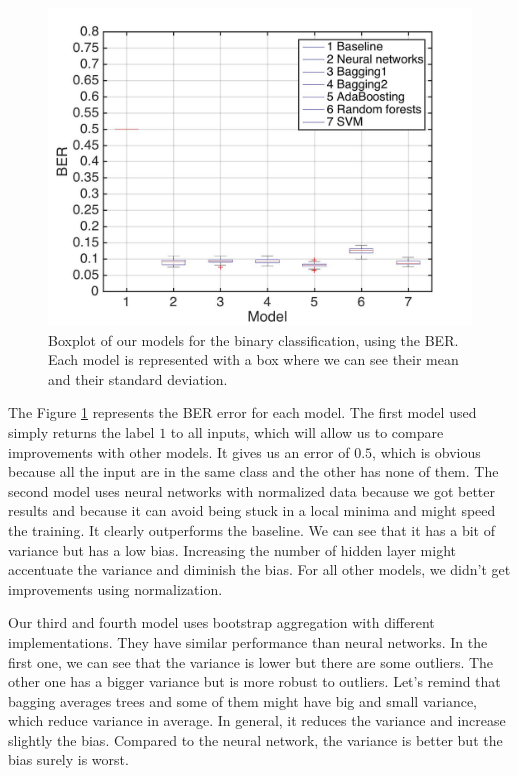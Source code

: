 \documentclass{article} %
\begin{document}
\begin{figure}
\center
\includegraphics[width=5in]{figures/binaryclassifications.jpg} 
\caption{Boxplot of our models for the binary classification, using the BER. Each model is represented with a box where we can see their mean and their standard deviation.}
\label{fig:bin_models}
\end{figure}

The Figure \ref{fig:bin_models} represents the BER error for each model. The first model used simply returns the label $1$ to all inputs, which will allow us to compare improvements with other models. It gives us an error of $0.5$, which is obvious because all the input are in the same class and the other has none of them. The second model uses neural networks with normalized data because we got better results and because it can avoid being stuck in a local minima and might speed the training. It clearly outperforms the baseline. We can see that it has a bit of variance but has a low bias. Increasing the number of hidden layer might accentuate the variance and diminish the bias. For all other models, we didn't get improvements using normalization.

Our third and fourth model uses bootstrap aggregation with different implementations. They have similar performance than neural networks. In the first one, we can see that the variance is lower but there are some outliers. The other one has a bigger variance but is more robust to outliers. Let's remind that bagging averages trees and some of them might have big and small variance, which reduce variance in average. In general, it reduces the variance and increase slightly the bias. Compared to the neural network, the variance is better but the bias surely is worst.
\end{document}
